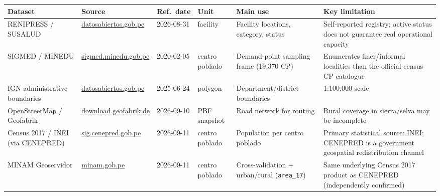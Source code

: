 \begin{tabular}{p{2.6cm}p{2.3cm}p{1.5cm}p{1.3cm}p{3.3cm}p{4.3cm}}
\toprule
Dataset & Source & Ref.\ date & Unit & Main use & Key limitation \\
\midrule
RENIPRESS / SUSALUD & \url{datosabiertos.gob.pe} & 2026-08-31 & facility & Facility locations, category, status & Self-reported registry; active status does not guarantee real operational capacity \\
SIGMED / MINEDU & \url{sigmed.minedu.gob.pe} & 2020-02-05 & centro poblado & Demand-point sampling frame (19{,}370 CP) & Enumerates finer/informal localities than the official census CP catalogue \\
IGN administrative boundaries & \url{datosabiertos.gob.pe} & 2025-06-24 & polygon & Department/district boundaries & 1:100{,}000 scale \\
OpenStreetMap / Geofabrik & \url{download.geofabrik.de} & 2026-09-10 & PBF snapshot & Road network for routing & Rural coverage in sierra/selva may be incomplete \\
Census 2017 / INEI (via CENEPRED) & \url{sig.cenepred.gob.pe} & 2026-09-11 & centro poblado & Population per centro poblado & Primary statistical source: INEI; CENEPRED is a government geospatial redistribution channel \\
MINAM Geoservidor & \url{minam.gob.pe} & 2026-09-11 & centro poblado & Cross-validation + urban/rural (\texttt{area\_17}) & Same underlying Census 2017 product as CENEPRED (independently confirmed) \\
\bottomrule
\end{tabular}
